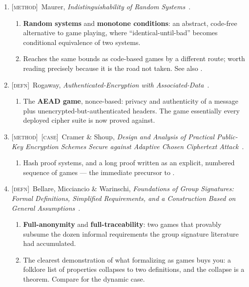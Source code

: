 \documentclass[11pt]{article}
\newcommand{\kind}[1]{{\footnotesize\textsc{\textcolor{yearcolor}{[#1]}}}\ }
\newcommand{\defn}{\kind{defn}}
\newcommand{\method}{\kind{method}}
\newcommand{\case}{\kind{case}}
\newcommand{\paper}[3]{#1, \emph{#2}~\cite{#3}.}
\begin{document}
\begin{enumerate}
  \item \method \paper{Maurer}{Indistinguishability of Random Systems}{Mau02}
    \begin{enumerate}
      \item \textbf{Random systems} and \textbf{monotone conditions}: an
        abstract, code-free alternative to game playing, where
        ``identical-until-bad'' becomes conditional equivalence of two systems.
      \item Reaches the same bounds as code-based games by a different route;
        worth reading precisely because it is the road not taken.
        See also \cite{MPR07}.
    \end{enumerate}

  \item \defn \paper{Rogaway}{Authenticated-Encryption with Associated-Data}
    {Rog02}
    \begin{enumerate}
      \item The \textbf{AEAD game}, nonce-based: privacy and authenticity of a
        message plus unencrypted-but-authenticated headers. The game essentially
        every deployed cipher suite is now proved against.
    \end{enumerate}

  \item \method\case \paper{Cramer \& Shoup}{Design and Analysis of Practical
    Public-Key Encryption Schemes Secure against Adaptive Chosen Ciphertext
    Attack}{CS03}
    \begin{enumerate}
      \item Hash proof systems, and a long proof written as an explicit,
        numbered sequence of games --- the immediate precursor to \cite{Shou04}.
    \end{enumerate}

  \item \defn \paper{Bellare, Micciancio \& Warinschi}{Foundations of Group
    Signatures: Formal Definitions, Simplified Requirements, and a Construction
    Based on General Assumptions}{BMW03}
    \begin{enumerate}
      \item \textbf{Full-anonymity} and \textbf{full-traceability}: two games
        that provably subsume the dozen informal requirements the group
        signature literature had accumulated.
      \item The clearest demonstration of what formalizing as games buys you:
        a folklore list of properties collapses to two definitions, and the
        collapse is a theorem. Compare \cite{BSZ05} for the dynamic case.
    \end{enumerate}


\end{enumerate}
\end{document}
